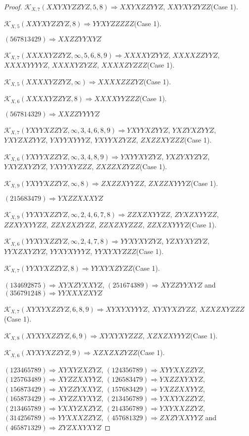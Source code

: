 \documentclass[12pt]{article}
\theoremstyle{plain}
\theoremstyle{definition}
\theoremstyle{remark}
\newcommand{\fancy}[1]{\mathcal{#1}}
\def\K{\fancy{K}}
\begin{document}
\begin{proof}
	$\K_{X,7}(XXYXYZZYZ,5, 8)\Rightarrow $$XXYXZZYYZ$, $XXYXYZYZZ$(Case 1).
	
	$\K_{X,5}(XXYXYZZYZ,8)\Rightarrow $$YYXYZZZZZ$(Case 1).
	
	
	
	$(5 6 7 8 1 3 4 2 9)\Rightarrow XXZZYYXYZ$
	
	
	$\K_{X,7}(XXXXYZZYZ,\infty,5, 6, 8, 9)\Rightarrow $$XXXXYZYYZ$, $XXXXZZYYZ$, $XXXXYYYYZ$, $XXXXYZYZZ$, $XXXXZYZZZ$(Case 1).
	
	$\K_{X,5}(XXXXYZZYZ,\infty)\Rightarrow $$XXXXZZZYZ$(Case 1).
	
	$\K_{X,6}(XXXXYZZYZ,8)\Rightarrow $$XXXXYYZZZ$(Case 1).
	
	
	
	$(5 6 7 8 1 4 3 2 9)\Rightarrow XXZZYYYYZ$
	
	
	$\K_{X,7}(YXYYXZZYZ,\infty,3, 4, 6, 8, 9)\Rightarrow $$YXYYXZYYZ$, $YXZYXZYYZ$, $YXYZXZYYZ$, $YXYYXYYYZ$, $YXYYXZYZZ$, $ZXZZXYZZZ$(Case 1).
	
	$\K_{X,6}(YXYYXZZYZ,\infty,3, 4, 8, 9)\Rightarrow $$YXYYXYZYZ$, $YXZYXYZYZ$, $YXYZXYZYZ$, $YXYYXYZZZ$, $ZXZZXZYZZ$(Case 1).
	
	$\K_{X,9}(YXYYXZZYZ,\infty,8)\Rightarrow $$ZXZZXYYZZ$, $ZXZZXYYYZ$(Case 1).
	
	
	
	$(2 1 5 6 8 3 4 7 9)\Rightarrow YXZZXXXYZ$
	
	
	$\K_{X,9}(YYXYXZZYZ,\infty,2, 4, 6, 7, 8)\Rightarrow $$ZZXZXYYZZ$, $ZYXZXYYZZ$, $ZZXYXYYZZ$, $ZZXZXZYZZ$, $ZZXZXYZZZ$, $ZZXZXYYYZ$(Case 1).
	
	$\K_{X,6}(YYXYXZZYZ,\infty,2, 4, 7, 8)\Rightarrow $$YYXYXYZYZ$, $YZXYXYZYZ$, $YYXZXYZYZ$, $YYXYXYYYZ$, $YYXYXYZZZ$(Case 1).
	
	$\K_{X,7}(YYXYXZZYZ,8)\Rightarrow $$YYXYXZYZZ$(Case 1).
	
	
	
	$(1 3 4 6 9 2 8 7 5)\Rightarrow XYXZYXXYZ$, $(2 5 1 6 7 4 3 8 9)\Rightarrow XYZZYYXYZ$ and $(3 5 6 7 9 1 2 4 8)\Rightarrow YYXXXZXYZ$
	
	
	$\K_{X,7}(XYXYXZZYZ,6, 8, 9)\Rightarrow $$XYXYXYYYZ$, $XYXYXZYZZ$, $XZXZXYZZZ$(Case 1).
	
	$\K_{X,8}(XYXYXZZYZ,6, 9)\Rightarrow $$XYXYXYZZZ$, $XZXZXYYYZ$(Case 1).
	
	$\K_{X,6}(XYXYXZZYZ,9)\Rightarrow $$XZXZXZYZZ$(Case 1).
	
	
	
	$(1 2 3 4 6 5 7 8 9)\Rightarrow XYXYZXZYZ$, $(1 2 4 3 5 6 7 8 9)\Rightarrow XYYXXZZYZ$, $(1 2 5 7 6 3 4 8 9)\Rightarrow XYZZXXYYZ$, $(1 2 6 5 8 3 4 7 9)\Rightarrow YXZZXYXYZ$, $(1 5 6 8 7 3 4 2 9)\Rightarrow XYZZYXXYZ$, $(1 5 7 6 8 3 4 2 9)\Rightarrow YXZZXXYYZ$, $(1 6 5 8 7 3 4 2 9)\Rightarrow XYZZXYXYZ$, $(2 1 3 4 5 6 7 8 9)\Rightarrow YXXYXZZYZ$, $(2 1 3 4 6 5 7 8 9)\Rightarrow YXXYZXZYZ$, $(2 1 4 3 5 6 7 8 9)\Rightarrow YXYXXZZYZ$, $(3 1 4 2 5 6 7 8 9)\Rightarrow YYXXXZZYZ$, $(4 5 7 6 8 1 3 2 9)\Rightarrow ZXZYXXYYZ$ and $(4 6 5 8 7 1 3 2 9)\Rightarrow ZYZXXYXYZ$
	

\end{proof}
\end{document}
